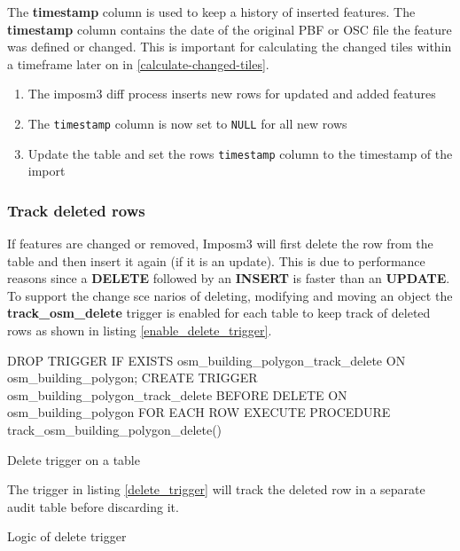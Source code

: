 The \textbf{timestamp} column is used to keep a history of inserted features. The \textbf{timestamp} column contains the date of the original PBF or OSC file the feature was defined or changed. This is important for calculating the changed tiles within a timeframe later on in \autoref{calculate-changed-tiles}.

\begin{enumerate}
   \item The imposm3 diff process inserts new rows for updated and added features
   \item The \texttt{timestamp} column is now set to \texttt{NULL} for all new rows
   \item Update the table and set the rows \texttt{timestamp} column to the timestamp of the import
\end{enumerate}

\subsubsection{Track deleted rows}

If \osm{} features are changed or removed, Imposm3 will first delete the row from the table and then insert it again (if it is an update). This is due to performance reasons since a \textbf{DELETE} followed by an \textbf{INSERT} is faster than an \textbf{UPDATE}.
 To support the change sce
 narios of deleting, modifying and moving an object the \textbf{track\_osm\_delete} trigger is enabled for each table to keep track of deleted rows as shown in listing \autoref{enable_delete_trigger}.

\begin{listing}[H]
  \centering
  \begin{sqlcode}
    DROP TRIGGER IF EXISTS osm_building_polygon_track_delete ON osm_building_polygon;
    CREATE TRIGGER osm_building_polygon_track_delete
    BEFORE DELETE ON osm_building_polygon
    FOR EACH ROW EXECUTE PROCEDURE track_osm_building_polygon_delete()
  \end{sqlcode}
  \caption{Delete trigger on a table}
  \label{enable_delete_trigger}
\end{listing}

The trigger in listing \autoref{delete_trigger} will track the deleted row in a separate audit table before discarding it.

\begin{listing}[H]
  \centering
  \caption{Logic of delete trigger}
  \label{delete_trigger}
\end{listing}

